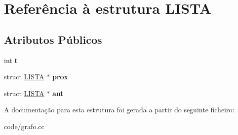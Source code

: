 \hypertarget{structLISTA}{\section{Referência à estrutura L\-I\-S\-T\-A}
\label{structLISTA}
}
\subsection*{Atributos Públicos}
\begin{DoxyCompactItemize}
\item 
\hypertarget{structLISTA_a81b29c44560db14d9d5ef75858c91a0b}{int {\bfseries t}}\label{structLISTA_a81b29c44560db14d9d5ef75858c91a0b}

\item 
\hypertarget{structLISTA_a818a9fbd5f34b29597c140c052309ea6}{struct \hyperlink{structLISTA}{L\-I\-S\-T\-A} $\ast$ {\bfseries prox}}\label{structLISTA_a818a9fbd5f34b29597c140c052309ea6}

\item 
\hypertarget{structLISTA_acbab5a56fa16181657e3036ffa9fca11}{struct \hyperlink{structLISTA}{L\-I\-S\-T\-A} $\ast$ {\bfseries ant}}\label{structLISTA_acbab5a56fa16181657e3036ffa9fca11}

\end{DoxyCompactItemize}


A documentação para esta estrutura foi gerada a partir do seguinte ficheiro\-:\begin{DoxyCompactItemize}
\item 
code/grafo.\-cc\end{DoxyCompactItemize}
